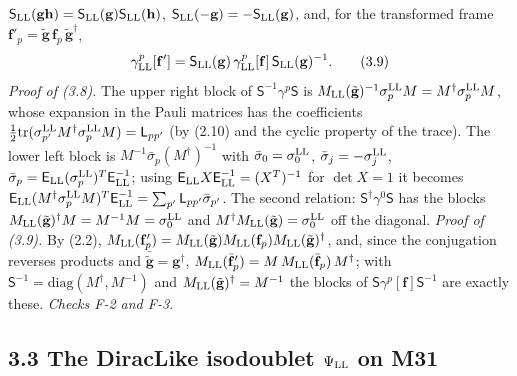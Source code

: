 \documentclass[
  10pt,
]{article}
\begin{document}
\(\mathsf S_{\rm LL}(\mathbf g\mathbf h)=\mathsf S_{\rm LL}(\mathbf g)\mathsf S_{\rm LL}(\mathbf h)\),
\(\mathsf S_{\rm LL}(-\mathbf g)=-\mathsf S_{\rm LL}(\mathbf g)\), and,
for the transformed frame
\(\mathbf f'_p=\tilde{\mathbf g}\,\mathbf f_p\,\tilde{\mathbf g}^\dagger\),
\[\gamma^p_{\rm LL}[\mathbf f']=\mathsf S_{\rm LL}(\mathbf g)\,\gamma^p_{\rm LL}[\mathbf f]\,\mathsf S_{\rm LL}(\mathbf g)^{-1}.\tag{3.9}\]
\emph{Proof of (3.8).} The upper right block of
\(\mathsf S^{-1}\gamma^p\mathsf S\) is
\(M_{\rm LL}(\tilde{\mathbf g})^{-1}\sigma^{\rm LL}_pM=M^\dagger\sigma^{\rm LL}_pM\),
whose expansion in the Pauli matrices has the coefficients
\(\tfrac12\mathrm{tr}(\sigma^{\rm LL}_{p'}M^\dagger\sigma^{\rm LL}_pM)=\mathsf L_{pp'}\)
(by (2.10) and the cyclic property of the trace). The lower left block
is \(M^{-1}\bar\sigma_p(M^\dagger)^{-1}\) with
\(\bar\sigma_0=\sigma^{\rm LL}_0\), \(\bar\sigma_j=-\sigma^{\rm LL}_j\),
\(\bar\sigma_p=\mathsf E_{\rm LL}(\sigma^{\rm LL}_p)^T\mathsf E_{\rm LL}^{-1}\);
using \(\mathsf E_{\rm LL}X\mathsf E_{\rm LL}^{-1}=(X^T)^{-1}\) for
\(\det X=1\) it becomes
\(\mathsf E_{\rm LL}(M^\dagger\sigma^{\rm LL}_pM)^T\mathsf E_{\rm LL}^{-1}=\sum_{p'}\mathsf L_{pp'}\bar\sigma_{p'}\).
The second relation: \(\mathsf S^\dagger\gamma^0\mathsf S\) has the
blocks
\(M_{\rm LL}(\tilde{\mathbf g})^\dagger M=M^{-1}M=\sigma^{\rm LL}_0\)
and \(M^\dagger M_{\rm LL}(\tilde{\mathbf g})=\sigma^{\rm LL}_0\) off
the diagonal. \emph{Proof of (3.9).} By (2.2),
\(M_{\rm LL}(\mathbf f'_p)=M_{\rm LL}(\tilde{\mathbf g})M_{\rm LL}(\mathbf f_p)M_{\rm LL}(\tilde{\mathbf g})^\dagger\),
and, since the conjugation reverses products and
\(\bar{\tilde{\mathbf g}}=\mathbf g^\dagger\),
\(M_{\rm LL}(\bar{\mathbf f}'_p)=M\,M_{\rm LL}(\bar{\mathbf f}_p)\,M^\dagger\);
with \(\mathsf S^{-1}=\mathrm{diag}(M^\dagger,M^{-1})\) and
\(M_{\rm LL}(\tilde{\mathbf g})^\dagger=M^{-1}\) the blocks of
\(\mathsf S\gamma^p[\mathbf f]\mathsf S^{-1}\) are exactly these.
\emph{Checks F-2 and F-3.}

\hypertarget{the-diraclike-isodoublet-psi_rm-ll-on-m31}{%
\subsection{\texorpdfstring{3.3 The DiracLike isodoublet
\(\Psi_{\rm LL}\) on
M31}{3.3 The DiracLike isodoublet \textbackslash Psi\_\{\textbackslash rm LL\} on M31}}\label{the-diraclike-isodoublet-psi_rm-ll-on-m31}}
\end{document}
